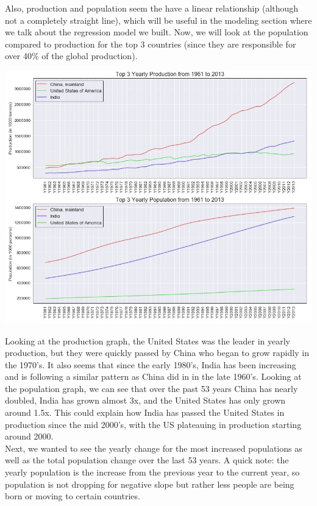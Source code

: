 \documentclass[12pt, a4paper]{article}
\begin{document}
\begin{spacing}{1.1}

	\noindent Also, production and population seem the have a linear relationship (although not a completely straight line), which will be useful in the modeling section where we talk about the regression model we built. Now, we will look at the population compared to production for the top 3 countries (since they are responsible for over 40\% of the global production).
	\begin{center}
	\includegraphics[scale=.63]{prod_pop} 
	\end{center}
	Looking at the production graph, the United States was the leader in yearly production, but they were quickly passed by China who began to grow rapidly in the 1970's. It also seems that since the early 1980's, India has been increasing and is following a similar pattern as China did in in the late 1960's. Looking at the population graph, we can see that over the past 53 years China has nearly doubled, India has grown almost 3x, and the United States has only grown around 1.5x. This could explain how India has passed the United States in production since the mid 2000's, with the US plateauing in production starting around 2000. \vspace*{2mm}\\
	Next, we wanted to see the yearly change for the most increased populations as well as the total population change over the last 53 years. A quick note: the yearly population is the increase from the previous year to the current year, so population is not dropping for negative slope but rather less people are being born or moving to certain countries. \newpage
	

\end{spacing}
\end{document}
